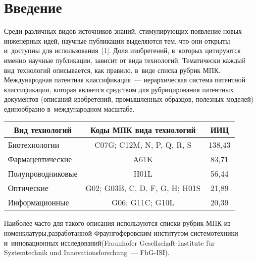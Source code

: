 \begin{multicols}{2}

\label{st\stat}

\section{Введение}
     
  Среди различных видов источников знаний, стимулирующих появление новых 
инженерных идей, научные пуб\-ли\-ка\-ции выделяются тем, что они открыты 
и~доступны для использования~[1]. Доля изобретений, в~которых цитируются 
именно научные пуб\-ли\-ка\-ции, зависит от вида технологий. Тематически каждый 
вид технологий описывается, как правило, в~виде списка рубрик 
МПК. Международная патентная классификация~--- иерархическая система 
патентной классификации, которая является средством для рубрицирования 
патентных документов (описаний изобретений, промышленных образцов, 
полезных моделей) единообразно в~международном масштабе. 

\begin{table*}\small
\begin{center}
      \vspace*{2ex}
      
      \begin{tabular}{|l|c|c|}
      \hline
\multicolumn{1}{|c|}{Вид технологий}&Коды МПК вида 
технологий&ИИЦ\\
     \hline
Биотехнологии&C07G; C12M, N, P, Q, R, S&138,43\hphantom{9}\\
Фармацевтические&A61K&83,71\\
Полупроводниковые&H01L&56,44\\
Оптические&G02; G03B, C, D, F, G, H; H01S&21,89\\
Информационные&G06; G11C; G10L&20,39\\
  \hline
  \end{tabular}
  \end{center}
  \vspace*{-3pt}
  \end{table*}
  
  Наиболее часто для такого описания исполь\-зуются списки рубрик МПК из 
номенклатуры,\linebreak раз\-работанной Фраунгоферовским институтом сис\-темотехники 
и~инновационных исследований\linebreak  (Fraunhofer Gesellschaft-Institute 
f$\ddot{\mbox{u}}$r Systemtechnik und Innovationsforschung~--- FhG-ISI). 


\end{multicols}

